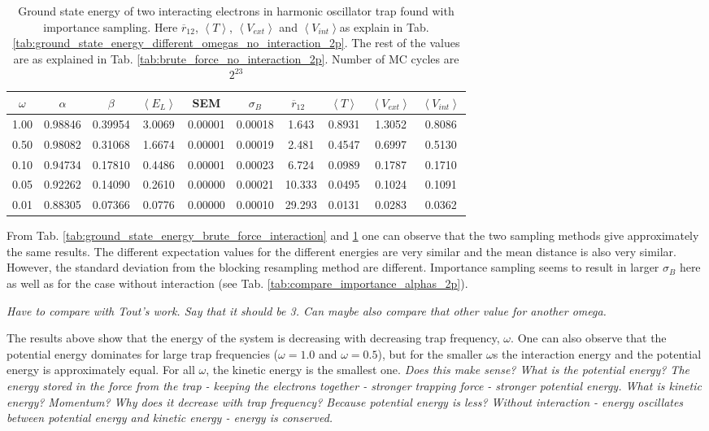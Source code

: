 \begin{table}[H]\caption{Ground state energy of two interacting electrons in harmonic oscillator trap found with importance sampling. Here $\overline{r}_{12}$,  $\left< T \right>$, $\left< V_{ext}\right>$  and $\left<V_{int} \right>$as explain in Tab. \ref{tab:ground_state_energy_different_omegas_no_interaction_2p}. The rest of the values are as explained in Tab. \ref{tab:brute_force_no_interaction_2p}. Number of MC cycles are $2^{23}$}\label{tab:ground_state_energy_importance_interaction}
\center
\begin{tabular}{c|ccccccccc}
$\omega$ & $\alpha$ & $\beta$ & $\left< E_L \right>$ & SEM & $\sigma_B$ &  $\overline{r}_{12} \,\,\,$ & $\left< T \right>$  & $\left< V_{ext}\right>$ & $\left<V_{int} \right>$  \\ \hline
1.00 & 0.98846 & 0.39954 & 3.0069 & 0.00001 & 0.00018 & 1.643 & 0.8931 & 1.3052 & 0.8086\\
0.50& 0.98082 & 0.31068 & 1.6674 & 0.00001 & 0.00019 & 2.481 & 0.4547 & 0.6997 & 0.5130\\
0.10 & 0.94734 & 0.17810 & 0.4486 & 0.00001 & 0.00023 & 6.724 & 0.0989 & 0.1787 & 0.1710\\
0.05 & 0.92262 & 0.14090 & 0.2610 & 0.00000 & 0.00021 & 10.333 & 0.0495 & 0.1024 & 0.1091\\
0.01 & 0.88305 & 0.07366 & 0.0776 & 0.00000 & 0.00010 & 29.293 & 0.0131 & 0.0283 & 0.0362\\
\end{tabular}
\end{table}

From Tab. \ref{tab:ground_state_energy_brute_force_interaction} and \ref{tab:ground_state_energy_importance_interaction} one can observe that the two sampling methods give approximately the same results. The different expectation values for the different energies are very similar and the mean distance is also very similar. However, the standard deviation from the blocking resampling method are different. Importance sampling seems to result in larger $\sigma_B$ here as well as for the case without interaction (see Tab. \ref{tab:compare_importance_alphas_2p}). 

\textit{Have to compare with Tout's work. Say that it should be 3. Can maybe also compare that other value for another omega.}

The results above show that the energy of the system is decreasing with decreasing trap frequency, $\omega$. One can also observe that the potential energy dominates for large trap frequencies ($\omega = 1.0$ and $\omega = 0.5$), but for the smaller $\omega$s the interaction energy and the potential energy is approximately equal. For all $\omega$, the kinetic energy is the smallest one. \textit{Does this make sense? What is the potential energy? The energy stored in the force from the trap - keeping the electrons together - stronger trapping force - stronger potential energy. What is kinetic energy? Momentum? Why does it decrease with trap frequency? Because potential energy is less? Without interaction - energy oscillates between potential energy and kinetic energy - energy is conserved. }

